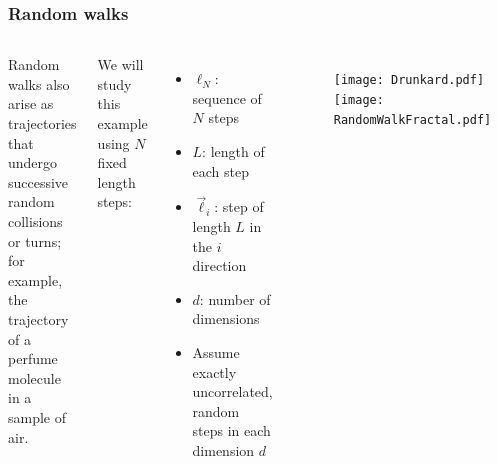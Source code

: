 \documentclass[hyperref={colorlinks=true}]{beamer}
\begin{document}
\begin{frame}%
  \frametitle{Random walks}
  
  \begin{columns}


    Random walks also arise as trajectories that undergo successive random collisions or turns; for example, the trajectory of a perfume molecule in a sample of air. 
    
    \vspace{0.5cm}    
    
    We will study this example using $N$ fixed length steps:
    
    \begin{itemize}
      \item $\ell_N$: sequence of $N$ steps
      \item $L$: length of each step
      \item $\vec{\ell}_i$: step of length $L$ in the $i$ direction
      \item $d$: number of dimensions
      \item Assume exactly uncorrelated, random steps in each dimension $d$
    \end{itemize}
    
    
      \begin{figure}
        \centering
        \texttt{[image: Drunkard.pdf]}\\
        \texttt{[image: RandomWalkFractal.pdf]}
      \end{figure}
    
  \end{columns}
  
\end{frame}

\end{document}
